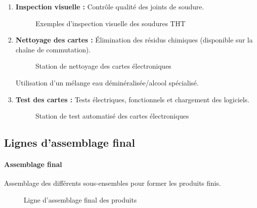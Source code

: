 \begin{enumerate}
    \item \textbf{Inspection visuelle :} Contrôle qualité des joints de soudure.
    
    \begin{figure}[H]
        \centering
        \caption{Exemples d'inspection visuelle des soudures THT}
        \label{fig:inspection_visuelle_tht}
    \end{figure}

    \item \textbf{Nettoyage des cartes :} Élimination des résidus chimiques (disponible sur la chaîne de commutation).
    
    \begin{figure}[H]
        \centering
        \caption{Station de nettoyage des cartes électroniques}
        \label{fig:nettoyage_cartes}
    \end{figure}
    
    Utilisation d'un mélange eau déminéralisée/alcool spécialisé.

    \item \textbf{Test des cartes :} Tests électriques, fonctionnels et chargement des logiciels.
    
    \begin{figure}[H]
        \centering
        \caption{Station de test automatisé des cartes électroniques}
        \label{fig:test_cartes}
    \end{figure}
\end{enumerate}

\subsection{Lignes d'assemblage final}
\label{subsec:lignes_final}

\paragraph{Assemblage final}

Assemblage des différents sous-ensembles pour former les produits finis.

\begin{figure}[H]
    \centering
    \caption{Ligne d'assemblage final des produits}
    \label{fig:assemblage_final}
\end{figure}

